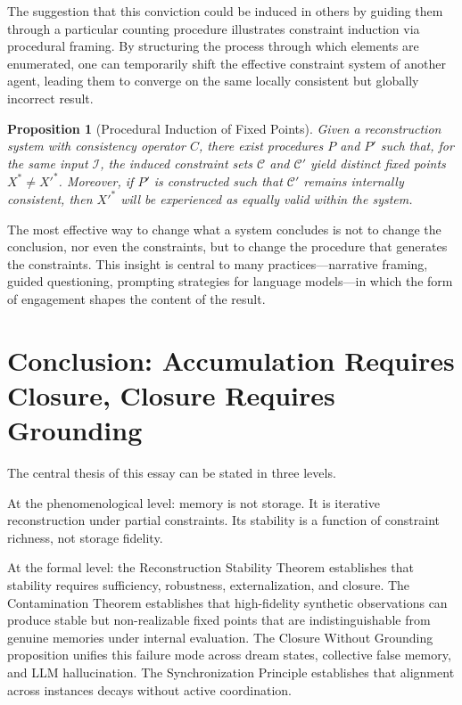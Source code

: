 \documentclass[12pt, letterpaper]{article}
\theoremstyle{flyxion}
\newtheorem{proposition}[theorem]{Proposition}
\begin{document}
The suggestion that this conviction could be induced in others by guiding them through a particular counting procedure illustrates constraint induction via procedural framing. By structuring the process through which elements are enumerated, one can temporarily shift the effective constraint system of another agent, leading them to converge on the same locally consistent but globally incorrect result.

\begin{proposition}[Procedural Induction of Fixed Points]
Given a reconstruction system with consistency operator $C$, there exist procedures $P$ and $P'$ such that, for the same input $\mathcal{I}$, the induced constraint sets $\mathcal{C}$ and $\mathcal{C}'$ yield distinct fixed points $X^* \neq X'^*$. Moreover, if $P'$ is constructed such that $\mathcal{C}'$ remains internally consistent, then $X'^*$ will be experienced as equally valid within the system.
\end{proposition}

The most effective way to change what a system concludes is not to change the conclusion, nor even the constraints, but to change the procedure that generates the constraints. This insight is central to many practices---narrative framing, guided questioning, prompting strategies for language models---in which the form of engagement shapes the content of the result.

\section{Conclusion: Accumulation Requires Closure, Closure Requires Grounding}

The central thesis of this essay can be stated in three levels.

At the phenomenological level: memory is not storage. It is iterative reconstruction under partial constraints. Its stability is a function of constraint richness, not storage fidelity.

At the formal level: the Reconstruction Stability Theorem establishes that stability requires sufficiency, robustness, externalization, and closure. The Contamination Theorem establishes that high-fidelity synthetic observations can produce stable but non-realizable fixed points that are indistinguishable from genuine memories under internal evaluation. The Closure Without Grounding proposition unifies this failure mode across dream states, collective false memory, and LLM hallucination. The Synchronization Principle establishes that alignment across instances decays without active coordination.
\end{document}
